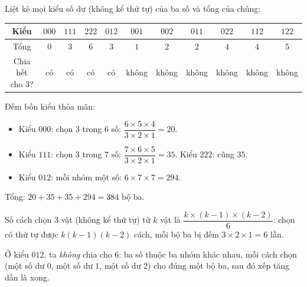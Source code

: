 {
Liệt kê mọi kiểu số dư (không kể thứ tự) của ba số và tổng của chúng:
\begin{center}\begin{tabular}{|c|c|c|c|c|c|c|c|c|c|c|}\hline
Kiểu & $000$ & $111$ & $222$ & $012$ & $001$ & $002$ & $011$ & $022$ & $112$ & $122$\\\hline
Tổng & $0$ & $3$ & $6$ & $3$ & $1$ & $2$ & $2$ & $4$ & $4$ & $5$\\\hline
Chia hết cho $3$? & có & có & có & có & không & không & không & không & không & không\\\hline
\end{tabular}\end{center}
Đếm bốn kiểu thỏa mãn:
\begin{itemize}[leftmargin=1.2em,itemsep=1pt,topsep=2pt]
\item Kiểu $000$: chọn $3$ trong $6$ số: $\dfrac{6\times5\times4}{3\times2\times1}=20$.
\item Kiểu $111$: chọn $3$ trong $7$ số: $\dfrac{7\times6\times5}{3\times2\times1}=35$. Kiểu $222$: cũng $35$.
\item Kiểu $012$: mỗi nhóm một số: $6\times7\times7=294$.
\end{itemize}
Tổng: $20+35+35+294=384$ bộ ba.
\begin{recallbox}Số cách chọn $3$ vật (không kể thứ tự) từ $k$ vật là $\dfrac{k\times(k-1)\times(k-2)}{6}$: chọn có thứ tự được
$k(k-1)(k-2)$ cách, mỗi bộ ba bị đếm $3\times2\times1=6$ lần.\end{recallbox}
\begin{warnbox}Ở kiểu $012$, ta \emph{không} chia cho $6$: ba số thuộc ba nhóm khác nhau, mỗi cách chọn (một số dư $0$, một số dư $1$,
một số dư $2$) cho đúng một bộ ba, sau đó xếp tăng dần là xong.\end{warnbox}
}

